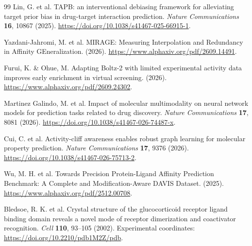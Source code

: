 \begin{thebibliography}{99}
 Lin, G. et al. TAPB: an interventional debiasing framework for alleviating target prior bias in drug-target interaction prediction. \textit{Nature Communications} \textbf{16}, 10867 (2025). \url{https://doi.org/10.1038/s41467-025-66915-1}.

 Yazdani-Jahromi, M. et al. MIRAGE: Measuring Interpolation and Redundancy in Affinity GEneralization. (2026). \url{https://www.alphaxiv.org/pdf/2609.14491}.

 Furui, K. \& Ohue, M. Adapting Boltz-2 with limited experimental activity data improves early enrichment in virtual screening. (2026). \url{https://www.alphaxiv.org/pdf/2609.24302}.

 Martinez Galindo, M. et al. Impact of molecular multimodality on neural network models for prediction tasks related to drug discovery. \textit{Nature Communications} \textbf{17}, 8081 (2026). \url{https://doi.org/10.1038/s41467-026-74487-x}.

 Cui, C. et al. Activity-cliff awareness enables robust graph learning for molecular property prediction. \textit{Nature Communications} \textbf{17}, 9376 (2026). \url{https://doi.org/10.1038/s41467-026-75713-2}.

 Wu, M. H. et al. Towards Precision Protein-Ligand Affinity Prediction Benchmark: A Complete and Modification-Aware DAVIS Dataset. (2025). \url{https://www.alphaxiv.org/pdf/2512.00708}.

 Bledsoe, R. K. et al. Crystal structure of the glucocorticoid receptor ligand binding domain reveals a novel mode of receptor dimerization and coactivator recognition. \textit{Cell} \textbf{110}, 93--105 (2002). Experimental coordinates: \url{https://doi.org/10.2210/pdb1M2Z/pdb}.

\end{thebibliography}
